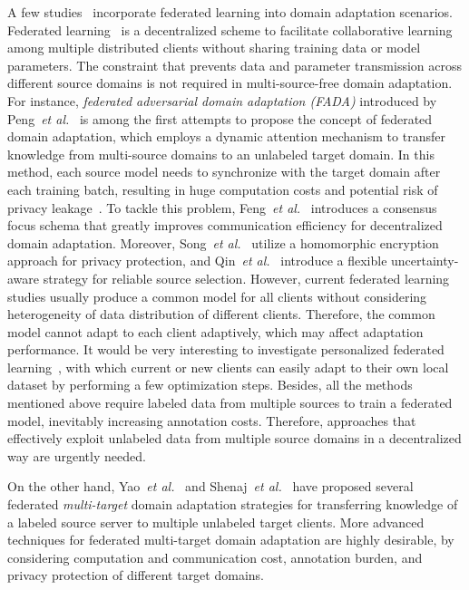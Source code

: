 \documentclass[10pt,journal,compsoc]{IEEEtran}
\def\etal{{\em et al.}}
\begin{document}
A few studies~\cite{peng2019federated, feng2021kd3a, kang2022privacy, song2020privacy, qin2022uncertainty} incorporate federated learning into domain adaptation scenarios.  
Federated learning~\cite{bonawitz2019towards, li2020federated, bonawitz2017practical} is a decentralized scheme to facilitate collaborative learning among multiple distributed clients without sharing training data or model parameters.
The constraint that prevents data and parameter transmission across different source domains is not required in multi-source-free domain adaptation.
For instance, \emph{federated adversarial domain adaptation (FADA)} introduced by Peng~\etal~\cite{peng2019federated} is among the first attempts to propose the concept of federated domain adaptation, which %
employs a dynamic attention mechanism to transfer knowledge from multi-source domains to an unlabeled target domain.
In this method, each source model needs to synchronize with the target domain after each training batch, resulting in huge computation costs and potential risk of privacy leakage~\cite{zhu2019deep}.
To tackle this problem, Feng~\etal~\cite{feng2021kd3a} introduces a consensus focus schema that greatly improves communication efficiency for decentralized domain adaptation.
Moreover, Song~\etal~\cite{song2020privacy} utilize a homomorphic encryption approach for privacy protection, and Qin~\etal~\cite{qin2022uncertainty} introduce a flexible uncertainty-aware strategy for reliable source selection.
However, current federated learning studies usually produce a common model for all clients without considering heterogeneity of data distribution of different clients.
Therefore, the common model cannot adapt to each client adaptively, which may affect adaptation performance.
It would be very interesting to investigate personalized federated learning~\cite{tan2022towards}, with which current or new clients can easily adapt to their own local dataset by performing a few optimization steps.
Besides, all the methods mentioned above require labeled data from multiple sources to train a federated model, inevitably increasing annotation costs.
Therefore, approaches that effectively exploit unlabeled data from multiple source domains in a decentralized way are urgently needed.


On the other hand, Yao~\etal~\cite{yao2022federated} and Shenaj~\etal~\cite{shenaj2022learning} have proposed several federated \emph{multi-target} domain adaptation strategies for transferring knowledge of a labeled source server to multiple unlabeled target clients.
More advanced techniques for federated multi-target domain adaptation are highly desirable, by considering computation and communication cost, annotation burden, and privacy protection of different target domains.
\end{document}
